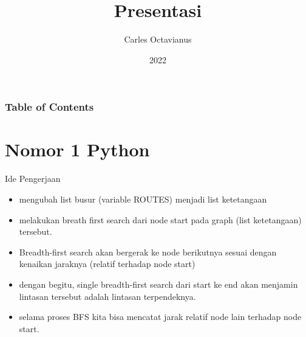 \documentclass{beamer}
\title[]{Presentasi}
\author[Carles]{Carles Octavianus}
\date{2022}
\begin{document}
\frame{\titlepage}

\begin{frame}[fragile]
    \frametitle{Table of Contents}
    \tableofcontents
\end{frame}


\section{Nomor 1 Python}
\begin{frame}{Ide Pengerjaan}
    \begin{itemize}
        \item mengubah list busur (variable ROUTES) menjadi list ketetangaan \pause
        \item melakukan breath first search dari node start pada graph (list ketetangaan) tersebut. \pause
        \item Breadth-first search akan bergerak ke node berikutnya sesuai dengan kenaikan jaraknya (relatif terhadap node start) \pause
        \item dengan begitu, single breadth-first search dari start ke end akan menjamin lintasan tersebut adalah lintasan terpendeknya. \pause
        \item selama proses BFS kita bisa mencatat jarak relatif node lain terhadap node start.
    \end{itemize}
\end{frame}
\end{document}
